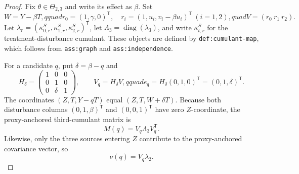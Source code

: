 \documentclass{article}
\begin{document}
\begin{proof}
Fix \(\theta\in\Theta_{2,3}\) and write its effect as \(\beta\).  Set
\[
 W=Y-\beta T,qquad
 r_0=(1,\gamma,0)^{\mathsf T},\quad
 r_i=(1,u_i,v_i-\beta u_i)^{\mathsf T}\ (i=1,2),quad
 V=(r_0\ r_1\ r_2).
\]
Let \(\lambda_r=(\kappa^S_{0,r},\kappa^S_{1,r},\kappa^S_{2,r})^{\mathsf T}\), let \(\Lambda_3=\operatorname{diag}(\lambda_3)\), and write \(\kappa^S_{t,r}\) for the treatment-disturbance cumulant.  These objects are defined by \texttt{def:cumulant-map}, which follows from \texttt{ass:graph} and \texttt{ass:independence}.

For a candidate \(q\), put \(\delta=\beta-q\) and
\[
 H_\delta=\begin{pmatrix}1&0&0\\0&1&0\\0&\delta&1\end{pmatrix},
 \qquad V_q=H_\delta V,qquad e_q=H_\delta(0,1,0)^{\mathsf T}=(0,1,\delta)^{\mathsf T}.
\]
The coordinates \((Z,T,Y-qT)\) equal \((Z,T,W+\delta T)\).  Because both disturbance columns \((0,1,\beta)^{\mathsf T}\) and \((0,0,1)^{\mathsf T}\) have zero \(Z\)-coordinate, the proxy-anchored third-cumulant matrix is
\[
 M(q)=V_q\Lambda_3V_q^{\mathsf T}. \tag{1}
\]
Likewise, only the three sources entering \(Z\) contribute to the proxy-anchored covariance vector, so
\[
 \nu(q)=V_q\lambda_2. \tag{2}
\]


\end{proof}
\end{document}
